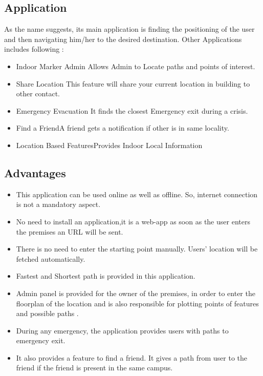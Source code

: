 \documentclass[a4paper, 12pt]{article}
\begin{document}
\subsection{Application}
As the name suggests, its main application is finding the positioning of the user and then navigating him/her to the desired destination.
\linebreak
Other Applications includes following :
\begin{itemize}
	\item {Indoor Marker Admin} Allows Admin to Locate  paths and points of interest.
	\item {Share Location} This feature will share your current location in building to other contact.
	\item {Emergency Evacuation} 	It finds the closest Emergency exit during a crisis.
	\item {Find a Friend}A friend gets a notification if other is in same locality.
	\item {Location Based Features}Provides Indoor Local Information
\end{itemize}

\subsection{Advantages}
\begin{itemize}
	\item This application can be used online as well as offline. So, internet connection is not a mandatory aspect.
	\item No need to install an application,it is a web-app as soon as the user enters the premises an URL will be sent.
	\item There is no need to enter the starting point manually. Users’ location will be fetched automatically.
	\item Fastest and Shortest path is provided in this application.
	\item Admin panel is provided for the owner of the premises, in order to enter the floorplan of the location and is also responsible for plotting points of features and possible paths .
	\item During any emergency, the application provides users with paths to emergency exit.
	\item It also provides a feature to find a friend. It gives a path from user to the friend if the friend is present in the same campus.
\end{itemize}
\end{document}
